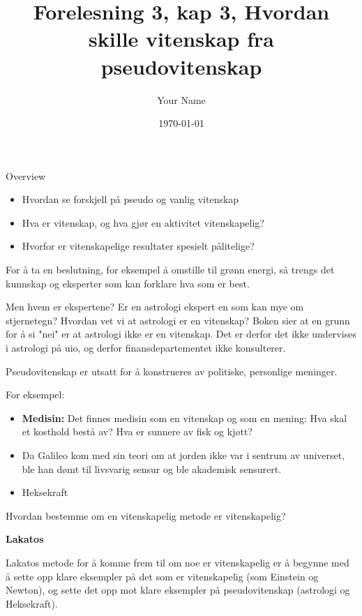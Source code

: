 \documentclass[11pt]{article}
\title{Forelesning 3, kap 3, Hvordan skille  vitenskap fra pseudovitenskap}
\author{Your Name}
\date{\today}
\begin{document}
\maketitle


Overview

\begin{itemize}
    \item Hvordan se forskjell på pseudo og vanlig vitenskap
    \item Hva er vitenskap, og hva gjør en aktivitet vitenskapelig?
    \item Hvorfor er vitenskapelige resultater spesielt pålitelige?
\end{itemize}


For å ta en beslutning, for eksempel å omstille til grønn energi,  så trengs det  kunnskap og eksperter som kan forklare  hva som er best.

Men hvem er ekspertene? Er en astrologi ekspert en som kan mye om stjernetegn? Hvordan vet vi at astrologi er en vitenskap?
Boken sier at en grunn for å si "nei" er at astrologi ikke er en vitenskap. Det er derfor  det ikke undervises i astrologi på uio, og derfor finansdepartementet ikke konsulterer.




Pseudovitenskap er utsatt for å konstrueres av politiske, personlige meninger.


For eksempel:
\begin{itemize}
    \item \textbf{Medisin:} Det finnes medisin som en vitenskap og som en mening: Hva skal et kosthold bestå av? Hva er sunnere av fisk og kjøtt?
    \item Da Galileo kom med sin teori om at jorden ikke var i sentrum av universet, ble han dømt til livsvarig sensur og ble akademisk sensurert.
    \item Heksekraft
\end{itemize}



Hvordan bestemme om en vitenskapelig metode er vitenskapelig?

\textbf{Lakatos}

Lakatos metode for å komme frem til om noe er vitenskapelig er å begynne med å sette opp klare eksempler på det som er vitenskapelig (som Einstein og Newton), og sette det opp mot klare eksempler på pseudovitenskap (astrologi og Heksekraft).
\end{document}
